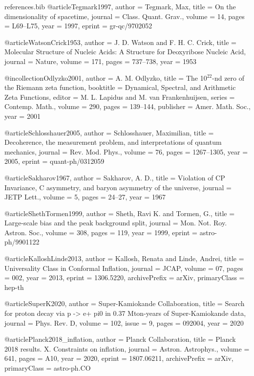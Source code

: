 \begin{filecontents}{references.bib}
@article{Tegmark1997,
  author  = {Tegmark, Max},
  title   = {{On the dimensionality of spacetime}},
  journal = {Class. Quant. Grav.},
  volume  = {14},
  pages   = {L69--L75},
  year    = {1997},
  eprint  = {gr-qc/9702052}
}

@article{WatsonCrick1953,
  author  = {J. D. Watson and F. H. C. Crick},
  title   = {{Molecular Structure of Nucleic Acids: A Structure for Deoxyribose Nucleic Acid}},
  journal = {Nature},
  volume  = {171},
  pages   = {737--738},
  year    = {1953}
}

@incollection{Odlyzko2001,
  author    = {A. M. Odlyzko},
  title     = {The 10$^{22}$-nd zero of the Riemann zeta function},
  booktitle = {Dynamical, Spectral, and Arithmetic Zeta Functions},
  editor    = {M. L. Lapidus and M. van Frankenhuijsen},
  series    = {Contemp. Math.},
  volume    = {290},
  pages     = {139--144},
  publisher = {Amer. Math. Soc.},
  year      = {2001}
}

@article{Schlosshauer2005,
  author  = {Schlosshauer, Maximilian},
  title   = {{Decoherence, the measurement problem, and interpretations of quantum mechanics}},
  journal = {Rev. Mod. Phys.},
  volume  = {76},
  pages   = {1267--1305},
  year    = {2005},
  eprint  = {quant-ph/0312059}
}

@article{Sakharov1967,
  author  = {Sakharov, A. D.},
  title   = {{Violation of CP Invariance, C asymmetry, and baryon asymmetry of the universe}},
  journal = {JETP Lett.},
  volume  = {5},
  pages   = {24--27},
  year    = {1967}
}

@article{ShethTormen1999,
  author  = {Sheth, Ravi K. and Tormen, G.},
  title   = {{Large-scale bias and the peak background split}},
  journal = {Mon. Not. Roy. Astron. Soc.},
  volume  = {308},
  pages   = {119},
  year    = {1999},
  eprint  = {astro-ph/9901122}
}

@article{KalloshLinde2013,
  author  = {Kallosh, Renata and Linde, Andrei},
  title   = {{Universality Class in Conformal Inflation}},
  journal = {JCAP},
  volume  = {07},
  pages   = {002},
  year    = {2013},
  eprint  = {1306.5220},
  archivePrefix = {arXiv},
  primaryClass = {hep-th}
}

@article{SuperK2020,
  author  = {{Super-Kamiokande Collaboration}},
  title   = {{Search for proton decay via p -> e+ pi0 in 0.37 Mton-years of Super-Kamiokande data}},
  journal = {Phys. Rev. D},
  volume  = {102},
  issue   = {9},
  pages   = {092004},
  year    = {2020}
}

@article{Planck2018_inflation,
  author  = {{Planck Collaboration}},
  title   = {{Planck 2018 results. X. Constraints on inflation}},
  journal = {Astron. Astrophys.},
  volume  = {641},
  pages   = {A10},
  year    = {2020},
  eprint  = {1807.06211},
  archivePrefix = {arXiv},
  primaryClass = {astro-ph.CO}
}


\end{filecontents}
